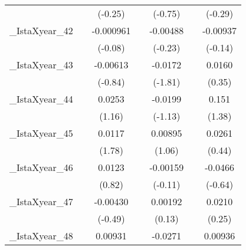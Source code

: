{\begin{tabular}{l*{6}{c}}
            &                     &     (-0.25)         &                     &     (-0.75)         &                     &     (-0.29)         \\
[1em]
\_IstaXyear\_42&                     &   -0.000961         &                     &    -0.00488         &                     &    -0.00937         \\
            &                     &     (-0.08)         &                     &     (-0.23)         &                     &     (-0.14)         \\
[1em]
\_IstaXyear\_43&                     &    -0.00613         &                     &     -0.0172         &                     &      0.0160         \\
            &                     &     (-0.84)         &                     &     (-1.81)         &                     &      (0.35)         \\
[1em]
\_IstaXyear\_44&                     &      0.0253         &                     &     -0.0199         &                     &       0.151         \\
            &                     &      (1.16)         &                     &     (-1.13)         &                     &      (1.38)         \\
[1em]
\_IstaXyear\_45&                     &      0.0117         &                     &     0.00895         &                     &      0.0261         \\
            &                     &      (1.78)         &                     &      (1.06)         &                     &      (0.44)         \\
[1em]
\_IstaXyear\_46&                     &      0.0123         &                     &    -0.00159         &                     &     -0.0466         \\
            &                     &      (0.82)         &                     &     (-0.11)         &                     &     (-0.64)         \\
[1em]
\_IstaXyear\_47&                     &    -0.00430         &                     &     0.00192         &                     &      0.0210         \\
            &                     &     (-0.49)         &                     &      (0.13)         &                     &      (0.25)         \\
[1em]
\_IstaXyear\_48&                     &     0.00931         &                     &     -0.0271         &                     &     0.00936         \\

\end{tabular}}
